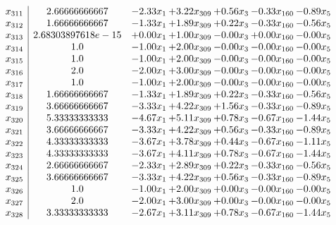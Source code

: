 \documentclass[8pt]{article}
\begin{document}
\[\begin{array}{c| c c@{\hskip 2pt} c@{\hskip 2pt} c@{\hskip 2pt} c@{\hskip 2pt} c@{\hskip 2pt} }
 x_{311}   &  2.66666666667 & -2.33 x_{1} & +  3.22 x_{309} & +  0.56 x_{3} & -0.33 x_{160} & -0.89 x_{5}\\
 x_{312}   &  1.66666666667 & -1.33 x_{1} & +  1.89 x_{309} & +  0.22 x_{3} & -0.33 x_{160} & -0.56 x_{5}\\
 x_{313}   &  2.68303897618e-15 & +  0.00 x_{1} & +  1.00 x_{309} & -0.00 x_{3} & +  0.00 x_{160} & -0.00 x_{5}\\
 x_{314}   &  1.0 & -1.00 x_{1} & +  2.00 x_{309} & -0.00 x_{3} & -0.00 x_{160} & -0.00 x_{5}\\
 x_{315}   &  1.0 & -1.00 x_{1} & +  2.00 x_{309} & -0.00 x_{3} & -0.00 x_{160} & -0.00 x_{5}\\
 x_{316}   &  2.0 & -2.00 x_{1} & +  3.00 x_{309} & -0.00 x_{3} & -0.00 x_{160} & -0.00 x_{5}\\
 x_{317}   &  1.0 & -1.00 x_{1} & +  2.00 x_{309} & -0.00 x_{3} & -0.00 x_{160} & -0.00 x_{5}\\
 x_{318}   &  1.66666666667 & -1.33 x_{1} & +  1.89 x_{309} & +  0.22 x_{3} & -0.33 x_{160} & -0.56 x_{5}\\
 x_{319}   &  3.66666666667 & -3.33 x_{1} & +  4.22 x_{309} & +  1.56 x_{3} & -0.33 x_{160} & -0.89 x_{5}\\
 x_{320}   &  5.33333333333 & -4.67 x_{1} & +  5.11 x_{309} & +  0.78 x_{3} & -0.67 x_{160} & -1.44 x_{5}\\
 x_{321}   &  3.66666666667 & -3.33 x_{1} & +  4.22 x_{309} & +  0.56 x_{3} & -0.33 x_{160} & -0.89 x_{5}\\
 x_{322}   &  4.33333333333 & -3.67 x_{1} & +  3.78 x_{309} & +  0.44 x_{3} & -0.67 x_{160} & -1.11 x_{5}\\
 x_{323}   &  4.33333333333 & -3.67 x_{1} & +  4.11 x_{309} & +  0.78 x_{3} & -0.67 x_{160} & -1.44 x_{5}\\
 x_{324}   &  2.66666666667 & -2.33 x_{1} & +  2.89 x_{309} & +  0.22 x_{3} & -0.33 x_{160} & -0.56 x_{5}\\
 x_{325}   &  3.66666666667 & -3.33 x_{1} & +  4.22 x_{309} & +  0.56 x_{3} & -0.33 x_{160} & -0.89 x_{5}\\
 x_{326}   &  1.0 & -1.00 x_{1} & +  2.00 x_{309} & +  0.00 x_{3} & -0.00 x_{160} & -0.00 x_{5}\\
 x_{327}   &  2.0 & -2.00 x_{1} & +  3.00 x_{309} & +  0.00 x_{3} & -0.00 x_{160} & -0.00 x_{5}\\
 x_{328}   &  3.33333333333 & -2.67 x_{1} & +  3.11 x_{309} & +  0.78 x_{3} & -0.67 x_{160} & -1.44 x_{5}\\

\end{array}\]
\end{document}
